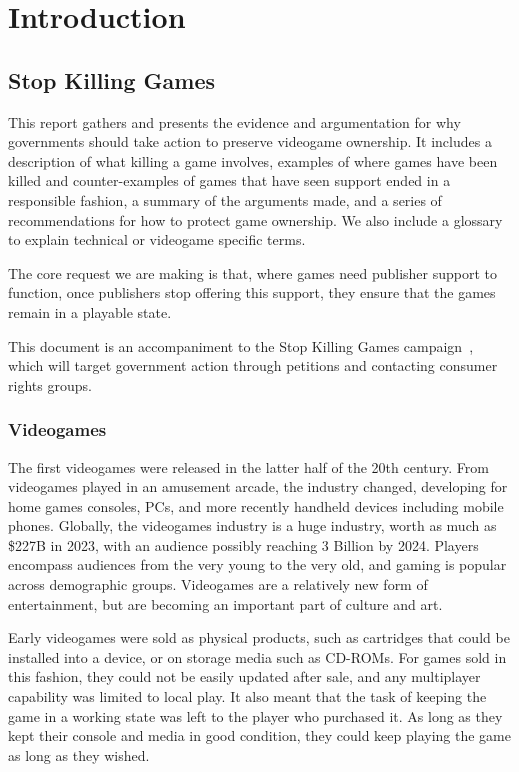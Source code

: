 \chapter{Introduction}

\section{Stop Killing Games}
This report gathers and presents the evidence and argumentation for why governments should take action to preserve \gls{videogame} ownership.
It includes a description of what killing a game involves,
examples of where games have been killed and counter-examples of games that have seen support ended in a responsible fashion,
a summary of the arguments made,
and a series of recommendations for how to protect game ownership.
We also include a glossary to explain technical or videogame specific terms.

The core request we are making is that, where games need publisher support to function,
once publishers stop offering this support,
they ensure that the games remain in a playable state.

This document is an accompaniment to the Stop Killing Games campaign~\cite{stop-killing-games-2024},
which will target government action through petitions and contacting consumer rights groups.

\subsection{Videogames}
The first videogames were released in the latter half of the 20th century.
From videogames played in an amusement arcade, the industry changed, developing for home games consoles, PCs, and more recently handheld devices including mobile phones.
Globally, the videogames industry is a huge industry, worth as much as \$227B in 2023\cite{pwc-games-2023},
with an audience possibly reaching 3 Billion by 2024\cite{stats-gamers-2024}.
Players encompass audiences from the very young to the very old, and gaming is popular across demographic groups\cn.
Videogames are a relatively new form of entertainment, but are becoming an important part of culture and art.

Early videogames were sold as physical products, such as cartridges that could be installed into a device, or on storage media such as CD-ROMs.
For games sold in this fashion, they could not be easily \gls{update}d after sale, and any multiplayer capability was limited to local play.
It also meant that the task of keeping the game in a working state was left to the player who purchased it.
As long as they kept their console and media in good condition, they could keep playing the game as long as they wished.

